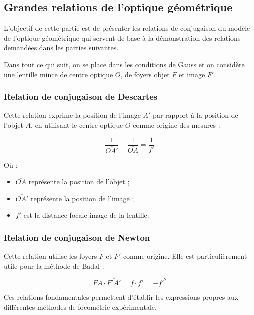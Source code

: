 \subsection{Grandes relations de l'optique géométrique}

L'objectif de cette partie est de présenter les relations de conjugaison 
du modèle de l'optique géométrique
qui servent de base à la démonstration des relations demandées 
dans les parties suivantes.

Dans tout ce qui suit, 
on se place dans les conditions de Gauss
et on considère une lentille mince de centre optique $O$, 
de foyers objet $F$ et image $F'$.

\subsubsection{Relation de conjugaison de Descartes}

Cette relation exprime la position de l'image $A'$ 
par rapport à la position de l'objet $A$, 
en utilisant le centre optique $O$ comme origine des mesures :

\begin{equation}
    \frac{1}{\overline{OA'}} - \frac{1}{\overline{OA}} = \frac{1}{f'}
\end{equation}

Où :
\begin{itemize}
    \item $\overline{OA}$ représente la position de l'objet ;
    \item $\overline{OA'}$ représente la position de l'image ;
    \item $f'$ est la distance focale image de la lentille.
\end{itemize}

\subsubsection{Relation de conjugaison de Newton}

Cette relation utilise les foyers $F$ et $F'$ comme origine. 
Elle est particulièrement utile pour la méthode de Badal :

\begin{equation}
    \overline{FA} \cdot \overline{F'A'} = f \cdot f' = -f'^{2}
\end{equation}

Ces relations fondamentales permettent d'établir les expressions propres 
aux différentes méthodes de focométrie expérimentale.

